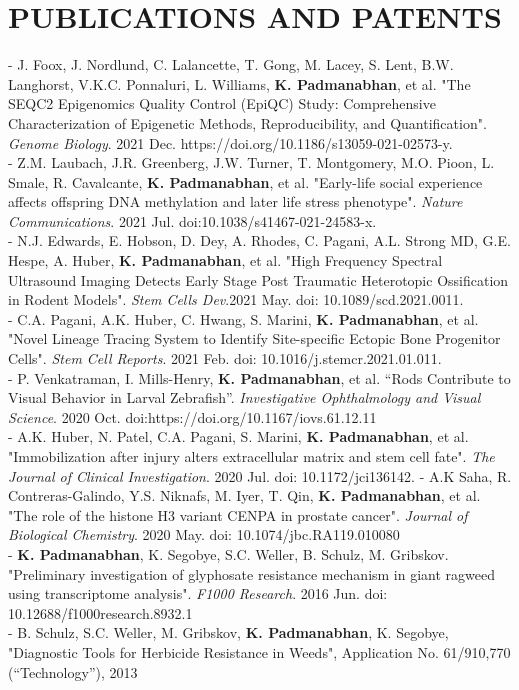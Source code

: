 \documentclass[11pt,letterpaper,sans]{moderncv}        %
\begin{document}
{\section{PUBLICATIONS AND PATENTS}
\begin{minipage}{\maincolumnwidth}%
	\small{
	- J. Foox, J. Nordlund, C. Lalancette, T. Gong, M. Lacey, S. Lent, B.W. Langhorst, V.K.C. Ponnaluri, L. Williams, \textbf{K. Padmanabhan}, et al. "The SEQC2 Epigenomics Quality Control (EpiQC) Study: Comprehensive Characterization of Epigenetic Methods, Reproducibility, and Quantification".  \textit{Genome Biology}. 2021 Dec. https://doi.org/10.1186/s13059-021-02573-y.\\
	- Z.M. Laubach, J.R. Greenberg, J.W. Turner, T. Montgomery, M.O. Pioon, L. Smale, R. Cavalcante, \textbf{K. Padmanabhan}, et al. "Early-life social experience affects offspring DNA methylation and later life stress phenotype". \textit{Nature Communications}. 2021 Jul. doi:10.1038/s41467-021-24583-x.\\
	- N.J. Edwards, E. Hobson, D. Dey, A. Rhodes, C. Pagani, A.L. Strong MD, G.E. Hespe, A. Huber, \textbf{K. Padmanabhan}, et al. "High Frequency Spectral Ultrasound Imaging Detects Early Stage Post Traumatic Heterotopic Ossification in Rodent Models". \textit{Stem Cells Dev}.2021 May. doi: 10.1089/scd.2021.0011.\\
	- C.A. Pagani, A.K. Huber, C. Hwang, S. Marini, \textbf{K. Padmanabhan}, et al. "Novel Lineage Tracing System to Identify Site-specific Ectopic Bone Progenitor Cells". \textit{Stem Cell Reports}. 2021 Feb. doi: 10.1016/j.stemcr.2021.01.011.\\
          - P. Venkatraman, I. Mills-Henry, \textbf{K. Padmanabhan}, et al. “Rods Contribute to Visual Behavior in Larval Zebrafish”. \textit{Investigative Ophthalmology and Visual Science}. 2020 Oct. doi:https://doi.org/10.1167/iovs.61.12.11\\
	- A.K. Huber, N. Patel, C.A. Pagani, S. Marini, \textbf{K. Padmanabhan}, et al. "Immobilization after injury alters extracellular matrix and stem cell fate". \textit{The Journal of Clinical Investigation}. 2020 Jul. doi: 10.1172/jci136142.
          - A.K Saha, R. Contreras-Galindo, Y.S. Niknafs, M. Iyer, T. Qin, \textbf{K. Padmanabhan}, et al. "The role of the histone H3 variant CENPA in prostate cancer". \textit{Journal of Biological Chemistry}. 2020 May. doi: 10.1074/jbc.RA119.010080\\
	- \textbf{K. Padmanabhan}, K. Segobye, S.C. Weller, B. Schulz, M. Gribskov. "Preliminary investigation of glyphosate resistance mechanism in giant ragweed using transcriptome analysis". \textit{F1000 Research}. 2016 Jun. doi: 10.12688/f1000research.8932.1\\
	- B. Schulz, S.C. Weller, M. Gribskov, \textbf{K. Padmanabhan}, K. Segobye, "Diagnostic Tools for Herbicide Resistance in Weeds", Application No. 61/910,770 (“Technology”), 2013
	}%
\end{minipage}%



}
\end{document}
